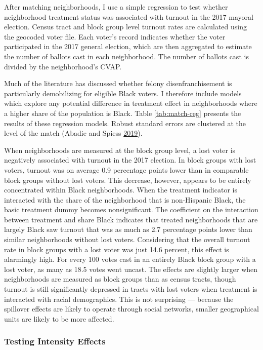 \documentclass[
  12pt,
]{article}
\begin{document}
After matching neighborhoods, I use a simple regression to test whether neighborhood treatment status was associated with turnout in the 2017 mayoral election. Census tract and block group level turnout rates are calculated using the geocoded voter file. Each voter's record indicates whether the voter participated in the 2017 general election, which are then aggregated to estimate the number of ballots cast in each neighborhood. The number of ballots cast is divided by the neighborhood's CVAP.

Much of the literature has discussed whether felony disenfranchisement is particularly demobilizing for eligible Black voters. I therefore include models which explore any potential difference in treatment effect in neighborhoods where a higher share of the population is Black. Table \ref{tab:match-reg} presents the results of these regression models. Robust standard errors are clustered at the level of the match (Abadie and Spiess \protect\hyperlink{ref-Abadie2019}{2019}).



When neighborhoods are measured at the block group level, a lost voter is negatively associated with turnout in the 2017 election. In block groups with lost voters, turnout was on average 0.9 percentage points lower than in comparable block groups without lost voters. This decrease, however, appears to be entirely concentrated within Black neighborhoods. When the treatment indicator is interacted with the share of the neighborhood that is non-Hispanic Black, the basic treatment dummy becomes nonsignificant. The coefficient on the interaction between treatment and share Black indicates that treated neighborhoods that are largely Black saw turnout that was as much as 2.7 percentage points lower than similar neighborhoods without lost voters. Considering that the overall turnout rate in block groups with a lost voter was just 14.6 percent, this effect is alarmingly high. For every 100 votes cast in an entirely Black block group with a lost voter, as many as 18.5 votes went uncast. The effects are slightly larger when neighborhoods are measured as block groups than as census tracts, though turnout is still significantly depressed in tracts with lost voters when treatment is interacted with racial demographics. This is not surprising --- because the spillover effects are likely to operate through social networks, smaller geographical units are likely to be more affected.

\hypertarget{testing-intensity-effects}{%
\subsubsection*{Testing Intensity Effects}\label{testing-intensity-effects}}
\end{document}
